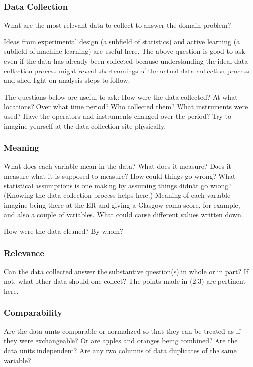 \documentclass[10pt,letterpaper]{article}
\begin{document}
\subsubsection*{Data Collection}

What are the most relevant data to collect to answer the domain problem?

Ideas from experimental design (a subfield of statistics) and active learning (a subfield of machine learning) are useful here. The above question is good to ask even if the data has already been collected because understanding the ideal data collection process might reveal shortcomings of the actual data collection process and shed light on analysis steps to follow.

The questions below are useful to ask: How were the data collected? At what locations? Over what time period? Who collected them? What instruments were used? Have the operators and instruments changed over the period? Try to imagine yourself at the data collection site physically.

\subsubsection*{Meaning}

What does each variable mean in the data? What does it measure? Does it measure what it is supposed to measure? How could things go wrong? What statistical assumptions is one making by assuming things didnât go wrong? (Knowing the data collection process helps here.) Meaning of each variable---imagine being there at the ER and giving a Glasgow coma score, for example, and also a couple of variables. What could cause different values written down.

How were the data cleaned? By whom?

\subsubsection*{Relevance}

Can the data collected answer the substantive question(s) in whole or in part? If not, what other data should one collect? The points made in (2.3) are pertinent here.

\subsubsection*{Comparability}

Are the data units comparable or normalized so that they can be treated as if they were exchangeable? Or are apples and oranges being combined? Are the data units independent? Are any two columns of data duplicates of the same variable?
\end{document}
